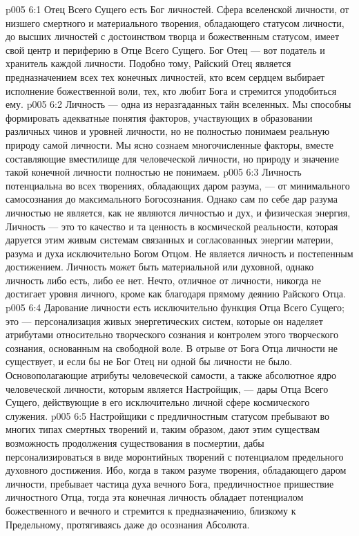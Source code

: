 \vs p005 6:1 Отец Всего Сущего есть Бог личностей. Сфера вселенской личности, от низшего смертного и материального творения, обладающего статусом личности, до высших личностей с достоинством творца и божественным статусом, имеет свой центр и периферию в Отце Всего Сущего. Бог Отец --- вот податель и хранитель каждой личности. Подобно тому, Райский Отец является предназначением всех тех конечных личностей, кто всем сердцем выбирает исполнение божественной воли, тех, кто любит Бога и стремится уподобиться ему.
\vs p005 6:2 \pc Личность --- одна из неразгаданных тайн вселенных. Мы способны формировать адекватные понятия факторов, участвующих в образовании различных чинов и уровней личности, но не полностью понимаем реальную природу самой личности. Мы ясно сознаем многочисленные факторы, вместе составляющие вместилище для человеческой личности, но природу и значение такой конечной личности полностью не понимаем.
\vs p005 6:3 Личность потенциальна во всех творениях, обладающих даром разума, --- от минимального самосознания до максимального Богосознания. Однако сам по себе дар разума личностью не является, как не являются личностью и дух, и физическая энергия, Личность --- это то качество и та ценность в космической реальности, которая даруется этим живым системам связанных и согласованных энергии материи, разума и духа исключительно Богом Отцом. Не является личность и постепенным достижением. Личность может быть материальной или духовной, однако личность либо есть, либо ее нет. Нечто, отличное от личности, никогда не достигает уровня личного, кроме как благодаря прямому деянию Райского Отца.
\vs p005 6:4 Дарование личности есть исключительно функция Отца Всего Сущего; это --- персонализация живых энергетических систем, которые он наделяет атрибутами относительно творческого сознания и контролем этого творческого сознания, основанным на свободной воле. В отрыве от Бога Отца личности не существует, и если бы не Бог Отец ни одной бы личности не было. Основополагающие атрибуты человеческой самости, а также абсолютное ядро человеческой личности, которым является Настройщик, --- дары Отца Всего Сущего, действующие в его исключительно личной сфере космического служения.
\vs p005 6:5 \pc Настройщики с предличностным статусом пребывают во многих типах смертных творений и, таким образом, дают этим существам возможность продолжения существования в посмертии, дабы персонализироваться в виде моронтийных творений с потенциалом предельного духовного достижения. Ибо, когда в таком разуме творения, обладающего даром личности, пребывает частица духа вечного Бога, предличностное пришествие личностного Отца, тогда эта конечная личность обладает потенциалом божественного и вечного и стремится к предназначению, близкому к Предельному, протягиваясь даже до осознания Абсолюта.
